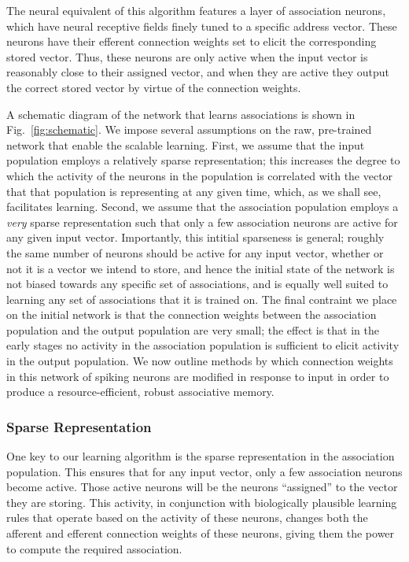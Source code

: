 \documentclass[10pt,letterpaper]{article}
\newcommand{\fg}{Fig.}
\begin{document}
The neural equivalent of this algorithm features a layer of association neurons, which have neural receptive fields finely tuned to a specific address vector. These neurons have their efferent connection weights set to elicit the corresponding stored vector. Thus, these neurons are only active when the input vector is reasonably close to their assigned vector, and when they are active they output the correct stored vector by virtue of the connection weights. 

A schematic diagram of the network that learns associations is shown in \fg~\ref{fig:schematic}. We impose several assumptions on the raw, pre-trained network that enable the scalable learning. First, we assume that the input population employs a relatively sparse representation; this increases the degree to which the activity of the neurons in the population is correlated with the vector that that population is representing at any given time, which, as we shall see, facilitates learning. Second, we assume that the association population employs a \textit{very} sparse representation such that only a few association neurons are active for any given input vector. Importantly, this intitial sparseness is general; roughly the same number of neurons should be active for any input vector, whether or not it is a vector we intend to store, and hence the initial state of the network is not biased towards any specific set of associations, and is equally well suited to learning any set of associations that it is trained on. The final contraint we place on the initial network is that the connection weights between the association population and the output population are very small; the effect is that in the early stages no activity in the association population is sufficient to elicit activity in the output population. We now outline methods by which connection weights in this network of spiking neurons are modified in response to input in order to produce a resource-efficient, robust associative memory.

\subsubsection{Sparse Representation}
One key to our learning algorithm is the sparse representation in the association population. This ensures that for any input vector, only a few association neurons become active. Those active neurons will be the neurons ``assigned'' to the vector they are storing. This activity, in conjunction with biologically plausible learning rules that operate based on the activity of these neurons, changes both the afferent and efferent connection weights of these neurons, giving them the power to compute the required association.
\end{document}
